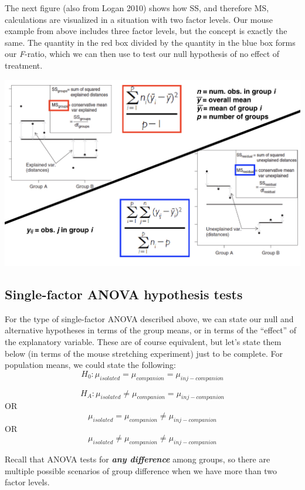 \documentclass[]{book}
\begin{document}
The next figure (also from Logan 2010) shows how SS, and therefore MS, calculations are visualized in a situation with two factor levels. Our mouse example from above includes three factor levels, but the concept is exactly the same. The quantity in the red box divided by the quantity in the blue box forms our \emph{F}-ratio, which we can then use to test our null hypothesis of no effect of treatment.

\begin{center}\includegraphics[width=0.9\linewidth]{images/images_5b.019} \end{center}

\hypertarget{single-factor-anova-hypothesis-tests}{%
\subsection{Single-factor ANOVA hypothesis tests}\label{single-factor-anova-hypothesis-tests}}

For the type of single-factor ANOVA described above, we can state our null and alternative hypotheses in terms of the group means, or in terms of the ``effect'' of the explanatory variable. These are of course equivalent, but let's state them below (in terms of the mouse stretching experiment) just to be complete. For population means, we could state the following:
\[H_0:\mu_{isolated}=\mu_{companion}=\mu_{inj-companion}\]

\[H_A:\mu_{isolated}\neq\mu_{companion}=\mu_{inj-companion}\]
OR
\[\mu_{isolated}=\mu_{companion}\neq\mu_{inj-companion}\]
OR
\[\mu_{isolated}\neq\mu_{companion}\neq\mu_{inj-companion}\]

Recall that ANOVA tests for \textbf{\emph{any difference}} among groups, so there are multiple possible scenarios of group difference when we have more than two factor levels.
\end{document}

